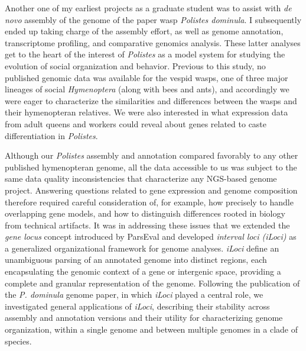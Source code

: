 Another one of my earliest projects as a graduate student was to assist with \textit{de novo} assembly of the genome of the paper wasp \textit{Polistes dominula}.
I subsequently ended up taking charge of the assembly effort, as well as genome annotation, transcriptome profiling, and comparative genomics analysis.
These latter analyses get to the heart of the interest of \textit{Polistes} as a model system for studying the evolution of social organization and behavior.
Previous to this study, no published genomic data was available for the vespid wasps, one of three major lineages of social \textit{Hymenoptera} (along with bees and ants), and accordingly we were eager to characterize the similarities and differences between the wasps and their hymenopteran relatives.
We were also interested in what expression data from adult queens and workers could reveal about genes related to caste differentiation in \textit{Polistes}.

Although our \textit{Polistes} assembly and annotation compared favorably to any other published hymenopteran genome, all the data accessible to us was subject to the same data quality inconsistencies that characterize any NGS-based genome project.
Answering questions related to gene expression and genome composition therefore required careful consideration of, for example, how precisely to handle overlapping gene models, and how to distinguish differences rooted in biology from technical artifacts.
It was in addressing these issues that we extended the \textit{gene locus} concept introduced by ParsEval and developed \textit{interval loci (iLoci)} as a generalized organizational framework for genome analyses.
\textit{iLoci} define an unambiguous parsing of an annotated genome into distinct regions, each encapsulating the genomic context of a gene or intergenic space, providing a complete and granular representation of the genome.
Following the publication of the \textit{P. dominula} genome paper, in which \textit{iLoci} played a central role, we investigated general applications of \textit{iLoci}, describing their stability across assembly and annotation versions and their utility for characterizing genome organization, within a single genome and between multiple genomes in a clade of species.

